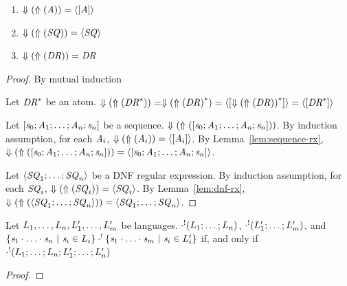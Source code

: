 \documentclass[numbers]{sigplanconf}
\begin{document}
\begin{lemma}\leavevmode
  \begin{enumerate}
  \item $\Downarrow(\Uparrow(\mathit{A}))=\langle[\mathit{A}]\rangle$
  \item $\Downarrow(\Uparrow(\mathit{SQ}))=\langle\mathit{SQ}\rangle$
  \item $\Downarrow(\Uparrow(\mathit{DR}))=\mathit{DR}$
  \end{enumerate}
\end{lemma}
\begin{proof}
  By mutual induction

  Let ${\mathit{DR}}^*$ be an atom.
  $\Downarrow(\Uparrow({\mathit{DR}}^*))=
  \Downarrow({\Uparrow(\mathit{DR})}^*)=
  \langle[{\Downarrow(\Uparrow(\mathit{DR}))}^*]\rangle=
  \langle[{\mathit{DR}}^*]\rangle$

  Let $[\mathit{s}_0;\mathit{A}_1;\ldots
    ;\mathit{A}_n;\mathit{s}_n]$ be a sequence.
  $\Downarrow(\Uparrow([\mathit{s}_0;\mathit{A}_1;\ldots
    ;\mathit{A}_n;\mathit{s}_n]))$.
  By induction assumption, for each $\mathit{A}_i$,
  $\Downarrow(\Uparrow(\mathit{A}_i))=\langle[\mathit{A}_i]\rangle$.
  By Lemma~\ref{lem:sequence-rx},
  $\Downarrow(\Uparrow([\mathit{s}_0;\mathit{A}_1;\ldots
    ;\mathit{A}_n;\mathit{s}_n]))=
  \langle[\mathit{s}_0;\mathit{A}_1;\ldots
      ;\mathit{A}_n;\mathit{s}_n]\rangle$.

  Let $\langle\mathit{SQ}_1;\ldots;\mathit{SQ}_n\rangle$ be a DNF
  regular expression.
  By induction assumption, for each $\mathit{SQ}_i$,
  $\Downarrow(\Uparrow(\mathit{SQ}_i))=\langle\mathit{SQ}_i\rangle$.
  By Lemma~\ref{lem:dnf-rx},
  $\Downarrow(\Uparrow(\langle\mathit{SQ}_1;\ldots;\mathit{SQ}_n\rangle))=
  \langle\mathit{SQ}_1;\ldots;\mathit{SQ}_n\rangle$.

\end{proof}





\begin{lemma}
  \label{lem:unambig-concat-equiv}
  Let $L_1,\ldots,L_n,L_1',\ldots,L_m'$ be
  languages. $\cdot^!(L_1;\ldots;L_n)$,
  $\cdot^!(L_1';\ldots;L_m')$, and
  $\{\mathit{s}_1\cdot\ldots\cdot\mathit{s}_n ~|~ \mathit{s}_i \in
    L_i\} \cdot^!
  \{\mathit{s}_1\cdot\ldots\cdot\mathit{s}_m ~|~ \mathit{s}_i \in
    L_i'\}$ if, and only if
  $\cdot^!(L_1;\ldots;L_n;L_1';\ldots;L_n')$
\end{lemma}
\begin{proof}
\end{proof}
\end{document}
